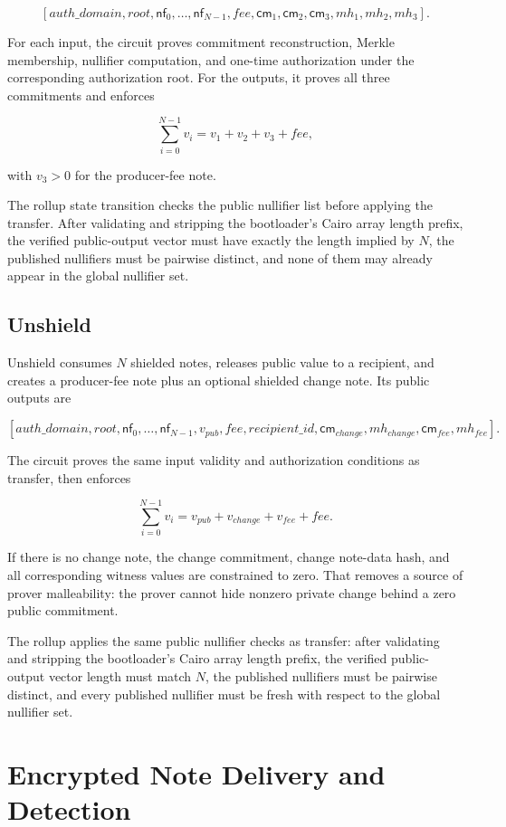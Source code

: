 \documentclass[11pt]{article}
\newcommand{\cm}{\mathsf{cm}}
\newcommand{\nf}{\mathsf{nf}}
\begin{document}
\[
[auth\_domain, root, \nf_0, \ldots, \nf_{N-1}, fee,
 \cm_1, \cm_2, \cm_3, mh_1, mh_2, mh_3].
\]

For each input, the circuit proves commitment reconstruction, Merkle membership,
nullifier computation, and one-time authorization under the corresponding
authorization root. For the outputs, it proves all three commitments and
enforces

\[
\sum_{i=0}^{N-1} v_i = v_1 + v_2 + v_3 + fee,
\]

with \(v_3 > 0\) for the producer-fee note.

The rollup state transition checks the public nullifier list before applying the
transfer. After validating and stripping the bootloader's Cairo array length
prefix, the verified public-output vector must have exactly the length implied by
\(N\), the published nullifiers must be pairwise distinct, and none of them may
already appear in the global nullifier set.

\subsection{Unshield}

Unshield consumes \(N\) shielded notes, releases public value to a recipient,
and creates a producer-fee note plus an optional shielded change note. Its
public outputs are

\[
[auth\_domain, root, \nf_0, \ldots, \nf_{N-1}, v_{pub}, fee,
 recipient\_id, \cm_{change}, mh_{change}, \cm_{fee}, mh_{fee}].
\]

The circuit proves the same input validity and authorization conditions as
transfer, then enforces

\[
\sum_{i=0}^{N-1} v_i = v_{pub} + v_{change} + v_{fee} + fee.
\]

If there is no change note, the change commitment, change note-data hash, and all
corresponding witness values are constrained to zero. That removes a source of
prover malleability: the prover cannot hide nonzero private change behind a
zero public commitment.

The rollup applies the same public nullifier checks as transfer: after validating
and stripping the bootloader's Cairo array length prefix, the verified
public-output vector length must match \(N\), the published nullifiers must be
pairwise distinct, and every published nullifier must be fresh with respect to
the global nullifier set.

\section{Encrypted Note Delivery and Detection}
\end{document}
